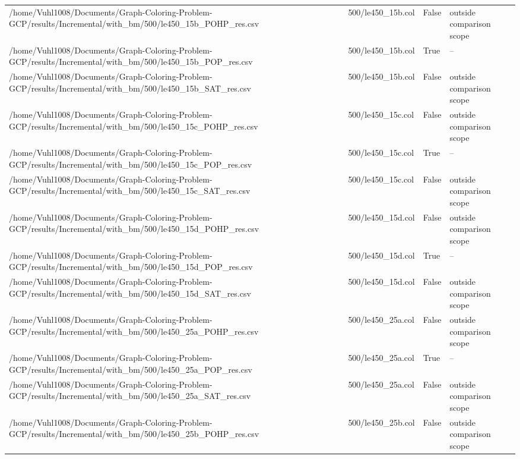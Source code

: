 \begin{table}[htbp]
\begin{tabular}{llll}
/home/Vuhl1008/Documents/Graph-Coloring-Problem-GCP/results/Incremental/with\_bm/500/le450\_15b\_POHP\_res.csv & 500/le450\_15b.col & False & outside comparison scope \\
/home/Vuhl1008/Documents/Graph-Coloring-Problem-GCP/results/Incremental/with\_bm/500/le450\_15b\_POP\_res.csv & 500/le450\_15b.col & True & -- \\
/home/Vuhl1008/Documents/Graph-Coloring-Problem-GCP/results/Incremental/with\_bm/500/le450\_15b\_SAT\_res.csv & 500/le450\_15b.col & False & outside comparison scope \\
/home/Vuhl1008/Documents/Graph-Coloring-Problem-GCP/results/Incremental/with\_bm/500/le450\_15c\_POHP\_res.csv & 500/le450\_15c.col & False & outside comparison scope \\
/home/Vuhl1008/Documents/Graph-Coloring-Problem-GCP/results/Incremental/with\_bm/500/le450\_15c\_POP\_res.csv & 500/le450\_15c.col & True & -- \\
/home/Vuhl1008/Documents/Graph-Coloring-Problem-GCP/results/Incremental/with\_bm/500/le450\_15c\_SAT\_res.csv & 500/le450\_15c.col & False & outside comparison scope \\
/home/Vuhl1008/Documents/Graph-Coloring-Problem-GCP/results/Incremental/with\_bm/500/le450\_15d\_POHP\_res.csv & 500/le450\_15d.col & False & outside comparison scope \\
/home/Vuhl1008/Documents/Graph-Coloring-Problem-GCP/results/Incremental/with\_bm/500/le450\_15d\_POP\_res.csv & 500/le450\_15d.col & True & -- \\
/home/Vuhl1008/Documents/Graph-Coloring-Problem-GCP/results/Incremental/with\_bm/500/le450\_15d\_SAT\_res.csv & 500/le450\_15d.col & False & outside comparison scope \\
/home/Vuhl1008/Documents/Graph-Coloring-Problem-GCP/results/Incremental/with\_bm/500/le450\_25a\_POHP\_res.csv & 500/le450\_25a.col & False & outside comparison scope \\
/home/Vuhl1008/Documents/Graph-Coloring-Problem-GCP/results/Incremental/with\_bm/500/le450\_25a\_POP\_res.csv & 500/le450\_25a.col & True & -- \\
/home/Vuhl1008/Documents/Graph-Coloring-Problem-GCP/results/Incremental/with\_bm/500/le450\_25a\_SAT\_res.csv & 500/le450\_25a.col & False & outside comparison scope \\
/home/Vuhl1008/Documents/Graph-Coloring-Problem-GCP/results/Incremental/with\_bm/500/le450\_25b\_POHP\_res.csv & 500/le450\_25b.col & False & outside comparison scope \\

\end{tabular}
\end{table}
